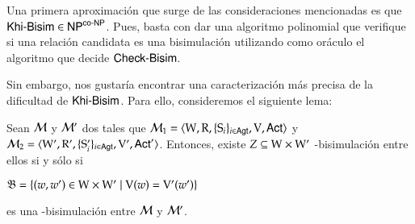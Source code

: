 Una primera aproximación que surge de las consideraciones mencionadas es que $\rm\textsf{Khi-Bisim} \in \rm\textsf{NP}^{\rm\textsf{co-NP}}$. Pues, basta con dar una 
algoritmo polinomial que verifique si una relación candidata es una bisimulación utilizando como oráculo el algoritmo que decide 
$\rm\textsf{Check-Bisim}$.

Sin embargo, nos gustaría encontrar una caracterización más precisa de la dificultad de $\rm\textsf{Khi-Bisim}$. Para ello, consideremos el siguiente 
lema:








\begin{lema}\label{lema:bisim-existence}
    Sean $\mathcal{M}$ y $\mathcal{M}'$ dos \ultss tales que 
    $\mathcal{M}_1=\langle \mathrm{W},\mathrm{R},\{ \mathrm{S}_i \}_{i \in {\rm \sf Agt}},\mathrm{V},{\rm \sf Act} \rangle$ y 
    $\mathcal{M}_2=\langle \mathrm{W}',\mathrm{R}',\{ \mathrm{S}_i' \}_{i \in {\rm \sf Agt}},\mathrm{V}',{\rm \sf Act}' \rangle$.
    Entonces, existe $Z \subseteq \mathrm{W} \times \mathrm{W}'$ \KHilogic-bisimulación entre ellos si y sólo si

    \begin{center}
        $\mathfrak{B} = \{(w,w') \in \mathrm{W} \times \mathrm{W}' \mid \mathrm{V}(w) = \mathrm{V}'(w')\}$
    \end{center}
    es una \KHilogic-bisimulación entre $\mathcal{M}$ y $\mathcal{M}'$.
\end{lema}

